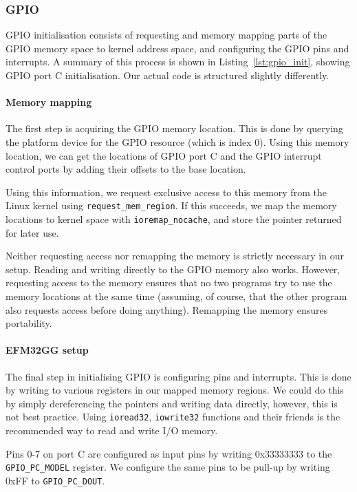 \subsubsection{GPIO}
GPIO initialisation consists of requesting and memory mapping parts of the GPIO memory space to kernel address space, and configuring the GPIO pins and interrupts. A summary of this process is shown in Listing~\ref{lst:gpio_init}, showing GPIO port C initialisation. Our actual code is structured slightly differently.

\paragraph{Memory mapping} The first step is acquiring the GPIO memory location. This is done by querying the platform device for the GPIO resource (which is index 0\cite{compendium}). Using this memory location, we can get the locations of GPIO port C and the GPIO interrupt control ports by adding their offsets to the base location.

Using this information, we request exclusive access to this memory from the Linux kernel using \texttt{request\_mem\_region}. If this succeeds, we map the memory locations to kernel space with \texttt{ioremap\_nocache}, and store the pointer returned for later use.

Neither requesting access nor remapping the memory is strictly necessary in our setup. Reading and writing directly to the GPIO memory also works. However, requesting access to the memory ensures that no two programs try to use the memory locations at the same time (assuming, of course, that the other program also requests access before doing anything). Remapping the memory ensures portability.

\paragraph{EFM32GG setup} The final step in initialising GPIO is configuring pins and interrupts. This is done by writing to various registers in our mapped memory regions. We could do this by simply dereferencing the pointers and writing data directly, however, this is not best practice. Using \texttt{ioread32}, \texttt{iowrite32} functions and their friends is the recommended way to read and write I/O memory.

Pins 0-7 on port C are configured as input pins by writing 0x33333333 to the \texttt{GPIO\_PC\_MODEL} register. We configure the same pins to be pull-up by writing 0xFF to \texttt{GPIO\_PC\_DOUT}. 

